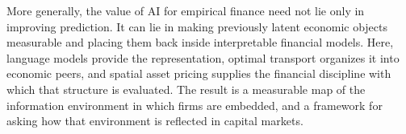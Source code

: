 More generally, the value of AI for empirical finance need not lie only in
improving prediction.
It can lie in making previously latent economic objects measurable and placing
them back inside interpretable financial models.
Here, language models provide the representation, optimal transport organizes
it into economic peers, and spatial asset pricing supplies the financial
discipline with which that structure is evaluated.
The result is a measurable map of the information environment in which firms
are embedded, and a framework for asking how that environment is reflected in
capital markets.
